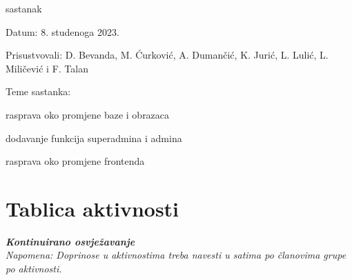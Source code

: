 \begin{packed_enum}
            \item  sastanak
			\item[] \begin{packed_item}
				\item Datum: 8. studenoga 2023.
				\item Prisustvovali: D. Bevanda, M. Ćurković, A. Dumančić, K. Jurić, L. Lulić, L. Miličević i F. Talan
				\item Teme sastanka:
				\begin{packed_item}
					\item rasprava oko promjene baze i obrazaca
                    \item dodavanje funkcija superadmina i admina
					\item rasprava oko promjene frontenda
				\end{packed_item}
			\end{packed_item}
			
			
		\end{packed_enum}
		
		\eject
		\section*{Tablica aktivnosti}
		
			\textbf{\textit{Kontinuirano osvježavanje}}\\
			
			 \textit{Napomena: Doprinose u aktivnostima treba navesti u satima po članovima grupe po aktivnosti.}

